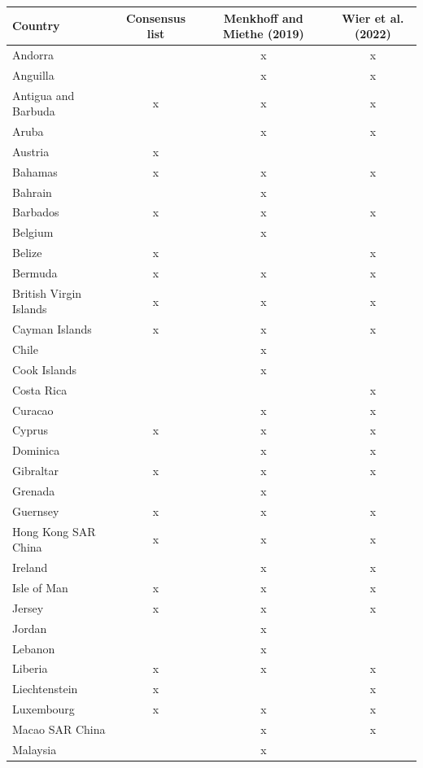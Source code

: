 \documentclass{article}
\begin{document}
\begin{table}[H]
\centering
\begin{adjustbox}{width=0.9\textwidth}
\begin{threeparttable}
    \hspace*{-1cm} 
\begin{tabular}{lccc}
\hline
\textbf{Country} & \textbf{Consensus list} & \textbf{Menkhoff and Miethe (2019)} & \textbf{Wier et al. (2022)} \\
\hline
Andorra &  & x & x \\
Anguilla &  & x & x \\
Antigua and Barbuda & x & x & x \\
Aruba &  & x & x \\
Austria & x &  &  \\
Bahamas & x & x & x \\
Bahrain &  & x &  \\
Barbados & x & x & x \\
Belgium &  & x &  \\
Belize & x &  & x \\
Bermuda & x & x & x \\
British Virgin Islands & x & x & x \\
Cayman Islands & x & x & x \\
Chile &  & x &  \\
Cook Islands &  & x &  \\
Costa Rica &  &  & x \\
Curacao &  & x & x \\
Cyprus & x & x & x \\
Dominica &  & x & x \\
Gibraltar & x & x & x \\
Grenada &  & x &  \\
Guernsey & x & x & x \\
Hong Kong SAR China & x & x & x \\
Ireland &  & x & x \\
Isle of Man & x & x & x \\
Jersey & x & x & x \\
Jordan &  & x &  \\
Lebanon &  & x &  \\
Liberia & x & x & x \\
Liechtenstein & x &  & x \\
Luxembourg & x & x & x \\
Macao SAR China &  & x & x \\
Malaysia &  & x &  \\

\end{tabular}
\end{threeparttable}
\end{adjustbox}
\end{table}
\end{document}
